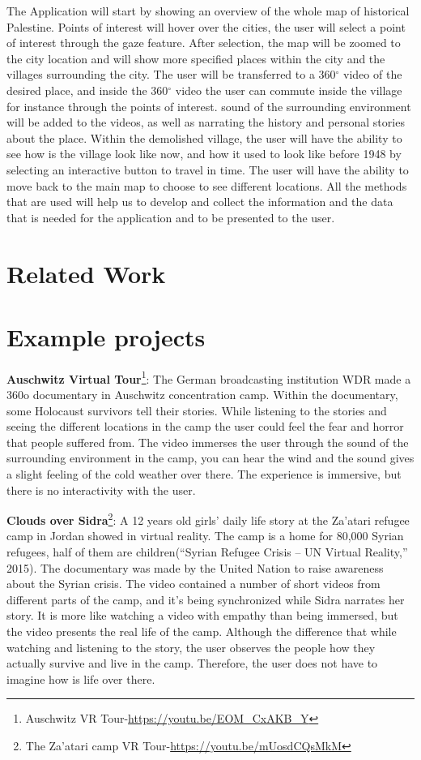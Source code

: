 The Application will start by showing an overview of the whole map of historical Palestine. Points of interest will hover over the cities, the user will select a point of interest through the gaze feature. After selection, the map will be zoomed to the city location and will show more specified places within the city and the villages surrounding the city. The user will be transferred to a 360$^{\circ}$ video of the desired place, and inside the 360$^{\circ}$ video the user can commute inside the village for instance through the points of interest. sound of the surrounding environment will be added to the videos, as well as narrating the history and personal stories about the place. Within the demolished village, the user will have the ability to see how is the village look like now, and how it used to look like before 1948 by selecting an interactive button to travel in time. The user will have the ability to move back to the main map to choose to see different locations. All the methods that are used will help us to develop and collect the information and the data that is needed for the application and to be presented to the user.
\section{Related Work}
\section{Example projects}
\textbf{Auschwitz Virtual Tour}\footnote{Auschwitz VR Tour-\url{https://youtu.be/EOM_CxAKB_Y}}: The German broadcasting institution WDR made a 360o
documentary in Auschwitz concentration camp. Within the documentary, some Holocaust
survivors tell their stories. While listening to the stories and seeing the different locations in
the camp the user could feel the fear and horror that people suffered from. The video
immerses the user through the sound of the surrounding environment in the camp, you can
hear the wind and the sound gives a slight feeling of the cold weather over there. The
experience is immersive, but there is no interactivity with the user.


\textbf{Clouds over Sidra}\footnote{The Za’atari camp VR Tour-\url{https://youtu.be/mUosdCQsMkM}}: A 12 years old girls’ daily life story at the Za’atari refugee camp in Jordan
showed in virtual reality. The camp is a home for 80,000 Syrian refugees, half of them are
children(“Syrian Refugee Crisis – UN Virtual Reality,” 2015). The documentary was made by
the United Nation to raise awareness about the Syrian crisis. The video contained a number
of short videos from different parts of the camp, and it’s being synchronized while Sidra
narrates her story. It is more like watching a video with empathy than being immersed, but
the video presents the real life of the camp. Although the difference that while watching and
listening to the story, the user observes the people how they actually survive and live in the
camp. Therefore, the user does not have to imagine how is life over there.


